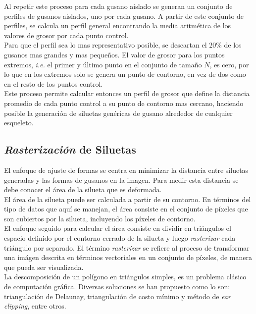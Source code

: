 Al repetir este proceso para cada gusano aislado se generan un conjunto de perfiles de gusanos
aislados, uno por cada gusano. A partir de este conjunto de perfiles, se calcula un perfil
general encontrando la media aritm\'etica de los valores de grosor por cada punto control.\\
Para que el perfil sea lo mas representativo posible, se descartan el $20\%$ de los gusanos
mas grandes y mas peque\~nos. El valor de grosor para los puntos extremos, \emph{i.e.} el
primer y \'ultimo punto en el conjunto de tama\~no $N$, es cero, por lo que en los extremos
solo se genera un punto de contorno, en vez de dos como en el resto de los puntos control.\\

Este proceso permite calcular entonces un perfil de grosor que define la distancia 
promedio de cada punto control a su punto de contorno mas cercano, haciendo posible
la generaci\'on de siluetas gen\'ericas de gusano alrededor de cualquier esqueleto.

\subsection{\emph{Rasterizaci\'on} de Siluetas}
\label{sec:metrast}

El enfoque de ajuste de formas se centra en minimizar la distancia entre siluetas
generadas y las formas de gusanos en la imagen. Para medir esta distancia se debe 
conocer el \'area de la silueta que es deformada.\\
El \'area de la silueta puede ser calculada a partir de su contorno. En t\'erminos
del tipo de datos que aqu\'i se manejan, el \'area consiste en el conjunto de p\'ixeles
que son cubiertos por la silueta, incluyendo los p\'ixeles de contorno.\\

El enfoque seguido para calcular el \'area consiste en dividir
en tri\'angulos el espacio definido por el contorno cerrado de la silueta y luego
\emph{rasterizar} cada tri\'angulo por separado. El t\'ermino \emph{rasterizar} se
refiere al proceso de transformar una im\'agen descrita en t\'erminos vectoriales
en un conjunto de p\'ixeles, de manera que pueda ser visualizada.\\

La descomposici\'on de un pol\'igono en tri\'angulos simples, es un problema
cl\'asico de computaci\'on gr\'afica. Diversas soluciones se han propuesto
como lo son: triangulaci\'on de Delaunay, triangulaci\'on de costo m\'inimo y
m\'etodo de \emph{ear clipping}, entre otros.
 

